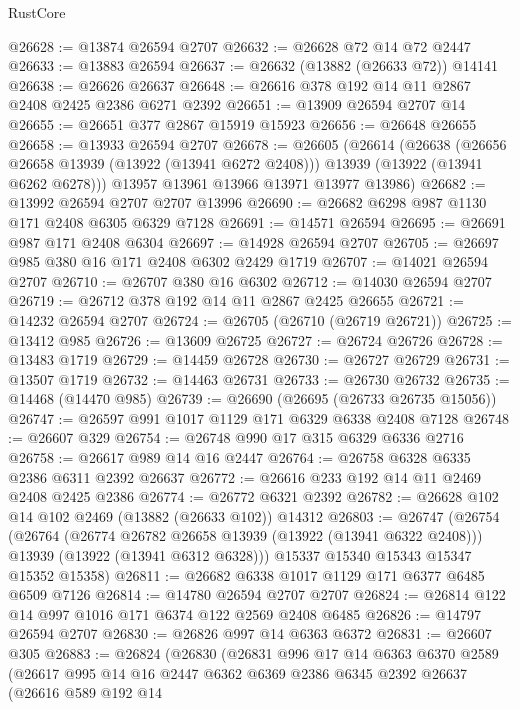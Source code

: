 \begin{lexlean}{RustCore}
\begin{coremodule}
@26628 := @13874 @26594 @2707
@26632 := @26628 @72 @14 @72 @2447
@26633 := @13883 @26594
@26637 := @26632 (@13882 (@26633 @72)) @14141
@26638 := @26626 @26637
@26648 := @26616 @378 @192 @14 @11 @2867 @2408 @2425 @2386 @6271 @2392
@26651 := @13909 @26594 @2707 @14
@26655 := @26651 @377 @2867 @15919 @15923
@26656 := @26648 @26655
@26658 := @13933 @26594 @2707
@26678 := @26605
    (@26614
      (@26638
        (@26656 @26658 @13939 (@13922 (@13941 @6272 @2408)))
        @13939
        (@13922 (@13941 @6262 @6278)))
      @13957
      @13961
      @13966
      @13971
      @13977
      @13986)
@26682 := @13992 @26594 @2707 @2707 @13996
@26690 := @26682 @6298 @987 @1130 @171 @2408 @6305 @6329 @7128
@26691 := @14571 @26594
@26695 := @26691 @987 @171 @2408 @6304
@26697 := @14928 @26594 @2707
@26705 := @26697 @985 @380 @16 @171 @2408 @6302 @2429 @1719
@26707 := @14021 @26594 @2707
@26710 := @26707 @380 @16 @6302
@26712 := @14030 @26594 @2707
@26719 := @26712 @378 @192 @14 @11 @2867 @2425 @26655
@26721 := @14232 @26594 @2707
@26724 := @26705 (@26710 (@26719 @26721))
@26725 := @13412 @985
@26726 := @13609 @26725
@26727 := @26724 @26726
@26728 := @13483 @1719
@26729 := @14459 @26728
@26730 := @26727 @26729
@26731 := @13507 @1719
@26732 := @14463 @26731
@26733 := @26730 @26732
@26735 := @14468 (@14470 @985)
@26739 := @26690 (@26695 (@26733 @26735 @15056))
@26747 := @26597 @991 @1017 @1129 @171 @6329 @6338 @2408 @7128
@26748 := @26607 @329
@26754 := @26748 @990 @17 @315 @6329 @6336 @2716
@26758 := @26617 @989 @14 @16 @2447
@26764 := @26758 @6328 @6335 @2386 @6311 @2392 @26637
@26772 := @26616 @233 @192 @14 @11 @2469 @2408 @2425 @2386
@26774 := @26772 @6321 @2392
@26782 := @26628 @102 @14 @102 @2469 (@13882 (@26633 @102)) @14312
@26803 := @26747
    (@26754
      (@26764
        (@26774 @26782 @26658 @13939 (@13922 (@13941 @6322 @2408)))
        @13939
        (@13922 (@13941 @6312 @6328)))
      @15337
      @15340
      @15343
      @15347
      @15352
      @15358)
@26811 := @26682 @6338 @1017 @1129 @171 @6377 @6485 @6509 @7126
@26814 := @14780 @26594 @2707 @2707
@26824 := @26814 @122 @14 @997 @1016 @171 @6374 @122 @2569 @2408 @6485
@26826 := @14797 @26594 @2707
@26830 := @26826 @997 @14 @6363 @6372
@26831 := @26607 @305
@26883 := @26824
    (@26830
      (@26831
        @996
        @17
        @14
        @6363
        @6370
        @2589
        (@26617
          @995
          @14
          @16
          @2447
          @6362
          @6369
          @2386
          @6345
          @2392
          @26637
          (@26616
            @589
            @192
            @14

\end{coremodule}
\end{lexlean}
